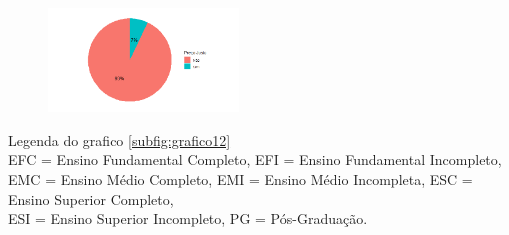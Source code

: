 \documentclass[11pt,a4paper]{article}
\begin{document}
\begin{figure}[H]
{\includegraphics[width=0.45\textwidth]{pizzapreco.png}
}
\end{figure}

\begin{figure}[H]
\centering
{}
\end{figure} 

\noindent
Legenda do grafico \ref{subfig:grafico12}\\
EFC = Ensino Fundamental Completo, EFI = Ensino Fundamental Incompleto, \\EMC = Ensino Médio Completo,
EMI = Ensino Médio Incompleta, ESC = Ensino Superior Completo,\\
ESI = Ensino Superior Incompleto, PG = Pós-Graduação.

\vspace{1cm}


\begin{figure}[H]
\centering
{}
\end{figure}
\end{document}
